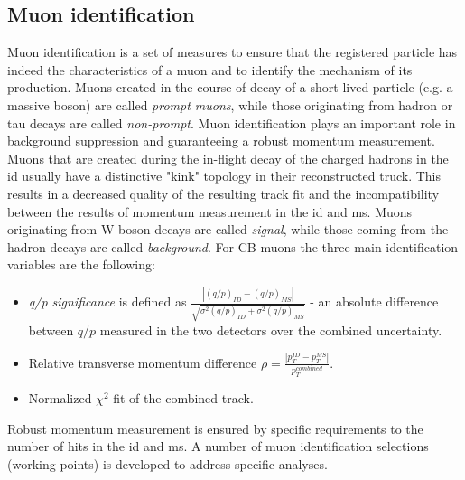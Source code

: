      \subsection{Muon identification}
     Muon identification is a set of measures to ensure that the registered particle has indeed the characteristics of a muon and to identify the mechanism of its production. Muons created in the course of decay of a short-lived particle (e.g. a massive boson) are called \textit{prompt muons}, while those originating from hadron or tau decays are called \textit{non-prompt}. Muon identification plays an important role in background suppression and guaranteeing a robust momentum measurement.\\
     Muons that are created during the in-flight decay of the charged hadrons in the \gls{id} usually have a distinctive "kink" topology in their reconstructed truck. This results in a decreased quality of the resulting track fit and the incompatibility between the results of momentum measurement in the \gls{id} and \gls{ms}. Muons originating from W boson decays are called \textit{signal}, while those coming from the hadron decays are called \textit{background}. For CB muons the three main identification variables are the following:
     \begin{itemize}
    	\item \textit{q/p significance} is defined as $\frac{|(q/p)_{ID}-(q/p)_{MS}|}{\sqrt{\sigma^2(q/p)_{ID}+\sigma^2(q/p)_{MS}}}$ - an absolute difference between $q/p$ measured in the two detectors over the combined uncertainty.
    	\item Relative transverse momentum difference $\rho = \frac{|p_T^{ID}-p_T^{MS}|}{p_T^{combined}}$.
    	\item Normalized $\chi^2$ fit of the combined track.
 	\end{itemize}
 	Robust momentum measurement is ensured by specific requirements to the number of hits in the \gls{id} and \gls{ms}. A number of muon identification selections (working points) is developed to address specific analyses. 
